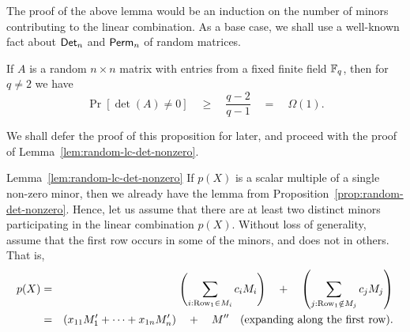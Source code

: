 The proof of the above lemma would be an induction on the number of minors contributing to the linear combination. As a base case, we shall use a well-known fact about $\mathsf{Det}_n$ and $\mathsf{Perm}_n$ of random matrices. 

\begin{proposition}\label{prop:random-det-nonzero}
  If $A$ is a random $n\times n$ matrix with entries from a fixed
  finite field $\mathbb{F}_q$, then for $q\neq 2$ we have
$$
\Pr[\det(A) \neq 0] \quad\geq\quad \frac{q-2}{q-1} \quad=\quad\Omega(1).
$$
\end{proposition}

We shall defer the proof of this proposition for later, and proceed with the proof of Lemma~\ref{lem:random-lc-det-nonzero}. 

\begin{proofof}{Lemma~\ref{lem:random-lc-det-nonzero}}
  If $p(X)$ is a scalar multiple of a single non-zero minor, then we
  already have the lemma from
  Proposition~\ref{prop:random-det-nonzero}. Hence, let us assume that
  there are at least two distinct minors participating in the linear
  combination $p(X)$. Without loss of generality, assume that the
  first row occurs in some of the minors, and does not in others. That is, 
  \begin{eqnarray*}
    p(X) &=& \left(\sum_{i:\text{Row}_1\in M_i} c_i M_i\right) \quad+ \quad \left(\sum_{j:\text{Row}_1\notin M_j} c_j M_j\right)\\
     & = & \left(x_{11} M_1' + \dots + x_{1n} M_{n}'\right) \quad+\quad M'' \quad\text{(expanding along the first row)}.
  \end{eqnarray*}
  

\end{proofof}
